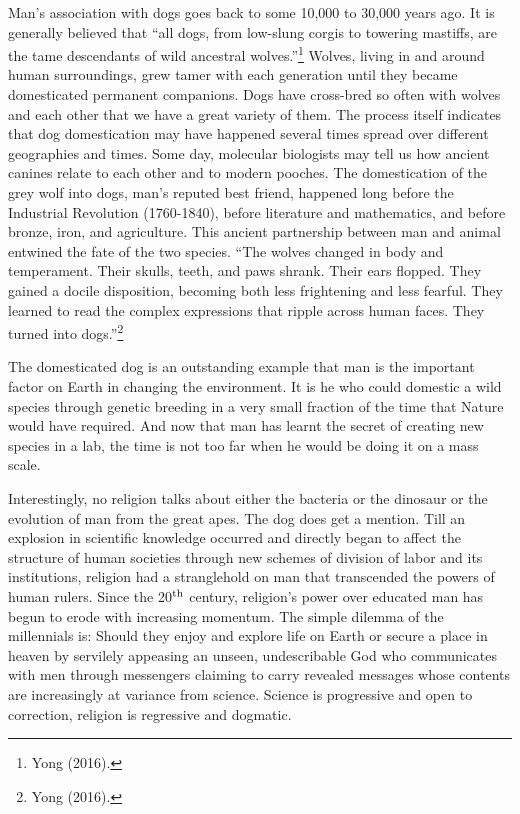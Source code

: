 \begin{multicols}{2}
Man's association with dogs goes back to some 10,000 to 30,000 years ago. It is generally believed
that “all dogs, from low-slung corgis to towering mastiffs, are the tame descendants of wild ancestral
wolves.”\footnote{Yong (2016).} Wolves, living in and around human surroundings, grew tamer with each generation until
they became domesticated permanent companions. Dogs have cross-bred so often with wolves and
each other that we have a great variety of them. The process itself indicates that dog domestication
may have happened several times spread over different geographies and times. Some day, molecular
biologists may tell us how ancient canines relate to each other and to modern pooches. The
domestication of the grey wolf into dogs, man's reputed best friend, happened long before the
Industrial Revolution (1760-1840), before literature and mathematics, and before bronze, iron, and
agriculture. This ancient partnership between man and animal entwined the fate of the two species.
“The wolves changed in body and temperament. Their skulls, teeth, and paws shrank. Their ears
flopped. They gained a docile disposition, becoming both less frightening and less fearful. They learned
to read the complex expressions that ripple across human faces. They turned into dogs.”\footnote{Yong (2016).}

The domesticated dog is an outstanding example that man is the important factor on Earth in changing
the environment. It is he who could domestic a wild species through genetic breeding in a very small
fraction of the time that Nature would have required. And now that man has learnt the secret of
creating new species in a lab, the time is not too far when he would be doing it on a mass scale.

Interestingly, no religion talks about either the bacteria or the dinosaur or the evolution of man from
the great apes. The dog does get a mention. Till an explosion in scientific knowledge occurred and
directly began to affect the structure of human societies through new schemes of division of labor and
its institutions, religion had a stranglehold on man that transcended the powers of human rulers. Since
the 20$^{\rm{ th}}$ century, religion's power over educated man has begun to erode with increasing momentum. The simple dilemma of the millennials is: Should they enjoy and explore life on Earth or secure a place in heaven by servilely appeasing an unseen, undescribable God who communicates with men through messengers claiming to carry revealed messages whose contents are increasingly at variance from science. Science is progressive and open to correction, religion is regressive and dogmatic.


\end{multicols}
